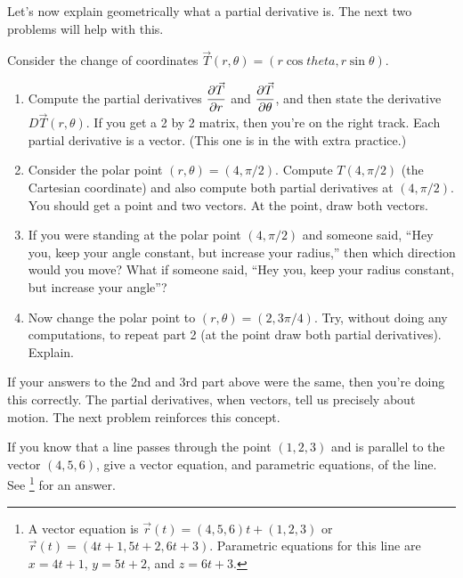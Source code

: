 Let's now explain geometrically what a partial derivative is. The next two problems will help with this.
\begin{problem}
 Consider the change of coordinates $\vec T(r,\theta) = (r\cos theta, r\sin \theta)$.
\begin{enumerate}
 \item Compute the partial derivatives $\displaystyle\frac{\partial \vec T}{\partial r}$ and $\displaystyle\frac{\partial \vec T}{\partial \theta}$, and then state the derivative $D\vec T(r,\theta)$. If you get a 2 by 2 matrix, then you're on the right track. Each partial derivative is a vector.  (This one is in the  with extra practice.)
 \item Consider the polar point $(r,\theta) = (4,\pi/2)$. Compute $T(4,\pi/2)$ (the Cartesian coordinate) and also compute both partial derivatives at $(4,\pi/2)$. You should get a point and two vectors.  At the point, draw both vectors.
 \item If you were standing at the polar point $(4,\pi/2)$ and someone said, ``Hey you, keep your angle constant, but increase your radius,'' then which direction would you move?  What if someone said, ``Hey you, keep your radius constant, but increase your angle''?
 \item Now change the polar point to $(r,\theta) = (2,3\pi/4)$.  Try, without doing  any computations, to repeat part 2 (at the point draw both partial derivatives). Explain.
\end{enumerate}
\end{problem}

If your answers to the 2nd and 3rd part above were the same, then you're doing this correctly.  The partial derivatives, when vectors, tell us precisely about motion. The next problem reinforces this concept.

\begin{review*}
 If you know that a line passes through the point $(1,2,3)$ and is parallel to the vector $(4,5,6)$, give a vector equation, and parametric equations, of the line. See \footnote{A vector equation is $\vec r(t) = (4,5,6)t+(1,2,3)$ or $\vec r(t) = (4t+1, 5t+2, 6t+3)$.  Parametric equations for this line are 
$x=4t+1$, $y=5t+2$, and $z=6t+3$. 
} for an answer.
\end{review*}



